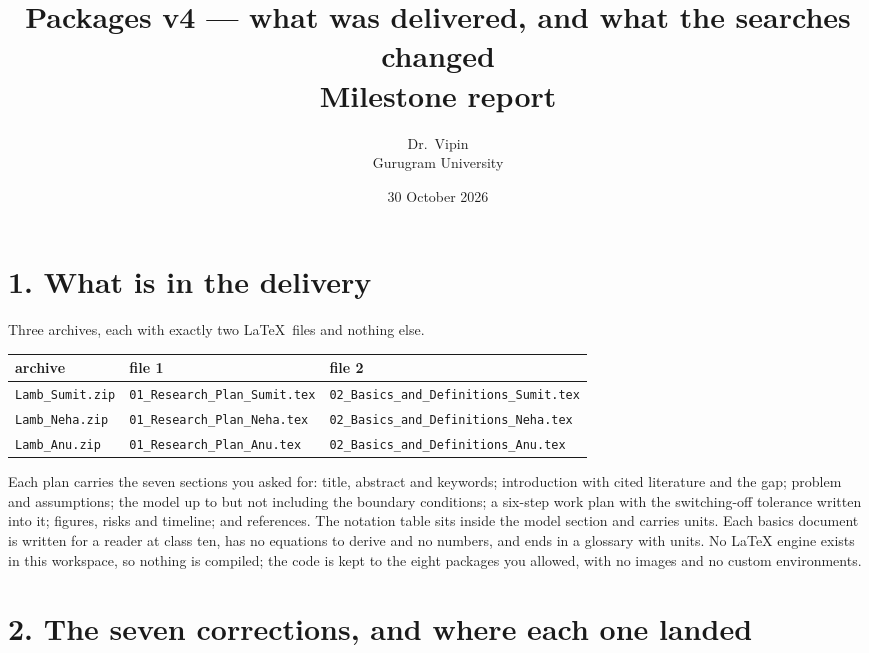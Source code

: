 \documentclass[11pt]{article}
\title{\vspace{-1.5cm}\textbf{Packages v4 --- what was delivered, and what the searches changed}\\[2pt]
\large Milestone report}
\author{Dr.\ Vipin \\ Gurugram University}
\date{30 October 2026}
\begin{document}
\maketitle
\vspace{-8mm}
\footnotesize

\section*{1. What is in the delivery}

Three archives, each with exactly two \LaTeX\ files and nothing else.

\begin{center}\footnotesize
\begin{tabular}{lll}
\toprule
archive & file 1 & file 2\\
\midrule
\texttt{Lamb\_Sumit.zip} & \texttt{01\_Research\_Plan\_Sumit.tex} & \texttt{02\_Basics\_and\_Definitions\_Sumit.tex}\\
\texttt{Lamb\_Neha.zip} & \texttt{01\_Research\_Plan\_Neha.tex} & \texttt{02\_Basics\_and\_Definitions\_Neha.tex}\\
\texttt{Lamb\_Anu.zip} & \texttt{01\_Research\_Plan\_Anu.tex} & \texttt{02\_Basics\_and\_Definitions\_Anu.tex}\\
\bottomrule
\end{tabular}
\end{center}

Each plan carries the seven sections you asked for: title, abstract and keywords; introduction with cited
literature and the gap; problem and assumptions; the model up to but not including the boundary conditions;
a six-step work plan with the switching-off tolerance written into it; figures, risks and timeline; and
references. The notation table sits inside the model section and carries units. Each basics document is
written for a reader at class ten, has no equations to derive and no numbers, and ends in a glossary with
units. No LaTeX engine exists in this workspace, so nothing is compiled; the code is kept to the eight
packages you allowed, with no images and no custom environments.

\section*{2. The seven corrections, and where each one landed}
\end{document}
